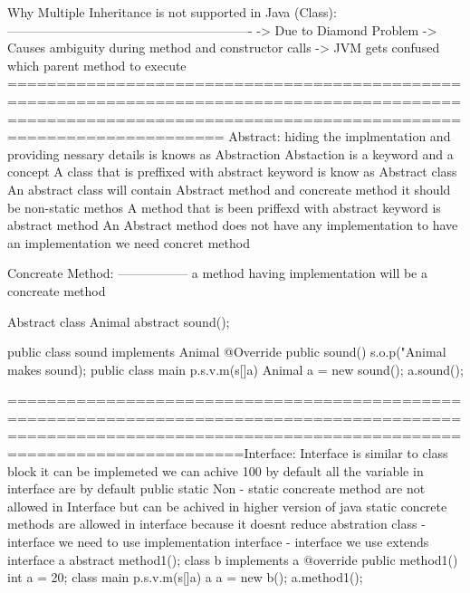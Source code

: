 Why Multiple Inheritance is not supported in Java (Class):
----------------------------------------------------------
-> Due to Diamond Problem
-> Causes ambiguity during method and constructor calls
-> JVM gets confused which parent method to execute
================================================================================================================================================================
Abstract:
          hiding the implmentation and providing nessary details is knows as Abstraction
          Abstaction is a keyword and a concept
          A class that is preffixed with abstract keyword is know as Abstract class
          An abstract class will contain  Abstract method and concreate method it should be non-static methos
          A method that is been priffexd with abstract keyword is abstract method
          An Abstract method does not have any implementation to have an implementation we need concret method 

   Concreate Method:
   -----------------
             a method having implementation will be a concreate method

   Abstract class Animal{
              abstract sound();
             }

 public class sound implements Animal{
                     @Override
                    public sound(){
                        s.o.p("Animal makes sound);
                        }
                        }
public class main{
          p.s.v.m(s[]a){
             Animal a = new sound();
             a.sound();
             }
          }

==================================================================================================================================================================Interface:
          Interface is similar to class block
          it can be implemeted
          we can achive 100%
          by default all the variable in interface are by default public static 
          Non - static concreate method are not allowed in Interface but can be achived in higher version of java
          static concrete methods are allowed in interface because it doesnt reduce abstration
          class - interface we need to use implementation
          interface - interface we use extends
          interface a{
                    abstract method1();
                    }
          class b implements a{
                    @override
                    public method1(){
                    int a = 20;
                    }
                    }
          class main{
                    p.s.v.m(s[]a){
                              a a = new b();
                              a.method1();
                              }
                              }

